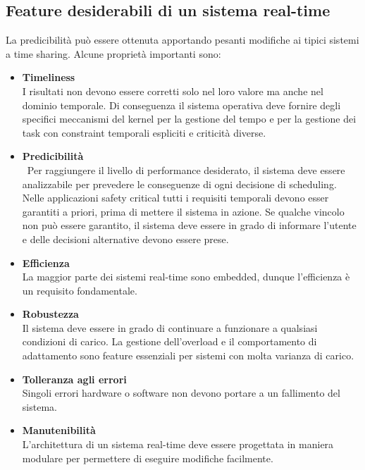 \documentclass[12pt]{article}
\begin{document}
\subsection{Feature desiderabili di un sistema real-time}
La predicibilità può essere ottenuta apportando pesanti modifiche ai tipici sistemi a time sharing.
Alcune proprietà importanti sono:
\begin{itemize}
\item \textbf{Timeliness}\\
    I risultati non devono essere corretti solo nel loro valore ma anche nel dominio temporale.
    Di conseguenza il sistema operativa deve fornire degli specifici meccanismi del kernel per la gestione del tempo e 
    per la gestione dei task con constraint temporali espliciti e criticità diverse.
\item \textbf{Predicibilità}\\\
    Per raggiungere il livello di performance desiderato, il sistema deve essere analizzabile per prevedere le conseguenze di ogni decisione di scheduling.
    Nelle applicazioni safety critical tutti i requisiti temporali devono esser garantiti a priori, prima di mettere il sistema in azione.
    Se qualche vincolo non può essere garantito, il sistema deve essere in grado di informare l'utente e delle decisioni alternative devono essere prese.
\item \textbf{Efficienza}\\
    La maggior parte dei sistemi real-time sono embedded, dunque l'efficienza è un requisito fondamentale.
\item \textbf{Robustezza}\\
    Il sistema deve essere in grado di continuare a funzionare a qualsiasi condizioni di carico. La gestione dell'overload e il comportamento di adattamento sono feature essenziali per sistemi con molta varianza di carico.
\item \textbf{Tolleranza agli errori}\\
    Singoli errori hardware o software non devono portare a un fallimento del sistema.
\item \textbf{Manutenibilità}\\
    L'architettura di un sistema real-time deve essere progettata in maniera modulare per permettere di eseguire modifiche facilmente.
\end{itemize}
\end{document}
